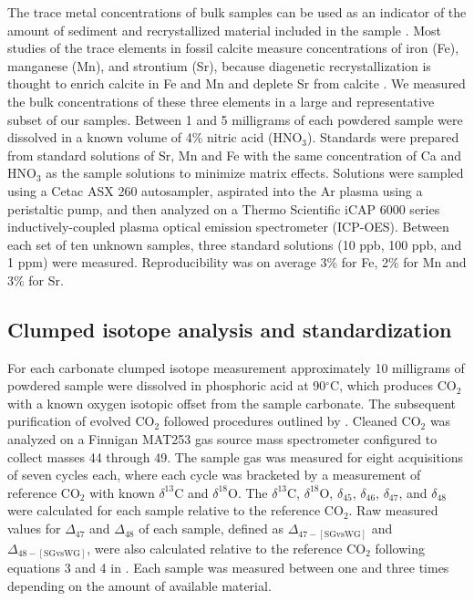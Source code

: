 \documentclass[preprint, authoryear]{elsarticle}
\begin{document}
The trace metal concentrations of bulk samples can be used as an indicator of the amount of sediment and recrystallized material included in the sample \citep{Azmy1998, Brand2012, Came2007, Finnegan2011}. Most studies of the trace elements in fossil calcite measure concentrations of iron (Fe), manganese (Mn), and strontium (Sr), because diagenetic recrystallization is thought to enrich calcite in Fe and Mn and deplete Sr from calcite \citep{Brand1980, Shields2003}. We measured the bulk concentrations of these three elements in a large and representative subset of our samples. Between 1 and 5 milligrams of each powdered sample were dissolved in a known volume of 4\% nitric acid (HNO$_3$). Standards were prepared from standard solutions of Sr, Mn and Fe with the same concentration of Ca and HNO$_3$ as the sample solutions to minimize matrix effects. Solutions were sampled using a Cetac ASX 260 autosampler, aspirated into the Ar plasma using a peristaltic pump, and then analyzed on a Thermo Scientific iCAP 6000 series inductively-coupled plasma optical emission spectrometer (ICP-OES). Between each set of ten unknown samples, three standard solutions (10 ppb, 100 ppb, and 1 ppm) were measured. Reproducibility was on average 3\% for Fe, 2\% for Mn and 3\% for Sr. 

\subsection{Clumped isotope analysis and standardization}

For each carbonate clumped isotope measurement approximately 10 milligrams of powdered sample were dissolved in phosphoric acid at 90$^{\circ}$C, which produces CO$_2$ with a known oxygen isotopic offset from the sample carbonate. The subsequent purification of evolved CO$_2$ followed procedures outlined by \cite{Passey2010}. Cleaned CO$_2$ was analyzed on a Finnigan MAT253 gas source mass spectrometer configured to collect masses 44 through 49. The sample gas was measured for eight acquisitions of seven cycles each, where each cycle was bracketed by a measurement of reference CO$_2$ with known $\delta^{13}$C and $\delta^{18}$O. The $\delta^{13}$C, $\delta^{18}$O, $\delta_{45}$, $\delta_{46}$, $\delta_{47}$, and $\delta_{48}$ were calculated for each sample relative to the reference CO$_2$. Raw measured values for $\Delta_{47}$ and $\Delta_{48}$ of each sample, defined as $\Delta_{47-[\text{SGvsWG}]}$ and $\Delta_{48-[\text{SGvsWG}]}$, were also calculated relative to the reference CO$_2$ following equations 3 and 4 in \cite{Huntington2009}. Each sample was measured between one and three times depending on the amount of available material.
\end{document}
